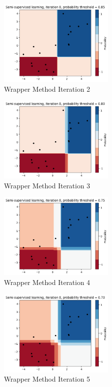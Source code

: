 \begin{figure}[H]
    \centering
    \includegraphics[width=0.5\textwidth]{images/img6.png}
    \caption{Wrapper Method Iteration 2}
    \label{fig:img6}
\end{figure}

\begin{figure}[H]
    \centering
    \includegraphics[width=0.5\textwidth]{images/img7.png}
    \caption{Wrapper Method Iteration 3}
    \label{fig:img7}
\end{figure}

\begin{figure}[H]
    \centering
    \includegraphics[width=0.5\textwidth]{images/img8.png}
    \caption{Wrapper Method Iteration 4}
    \label{fig:img8}
\end{figure}

\begin{figure}[H]
    \centering
    \includegraphics[width=0.5\textwidth]{images/img9.png}
    \caption{Wrapper Method Iteration 5}
    \label{fig:img9}
\end{figure}

